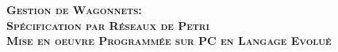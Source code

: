     \begin{titlepage}
    \centering
    \vspace*{\fill}

    \vspace*{0.5cm}
    \huge\bfseries
    \textsc{Gestion de Wagonnets:\\ Spécification par Réseaux de Petri\\
    Mise en oeuvre Programmée sur PC en Langage Evolué}
    \vspace*{0.5cm}
    
    \vspace*{\fill}
    \end{titlepage}